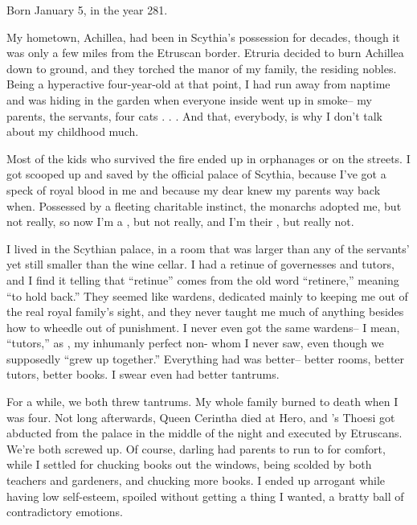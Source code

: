 \documentclass[char]{Kos}
\begin{document}
\name{\cWard{}}

Born January 5, in the year 281.

My hometown, Achillea, had been in Scythia's possession for decades, though it was only a few miles from the Etruscan border. Etruria decided to burn Achillea down to ground, and they torched the manor of my family, the residing nobles. Being a hyperactive four-year-old at that point, I had run away from naptime and was hiding in the garden when everyone inside went up in smoke-- my parents, the servants, four cats . . . And that, everybody, is why I don't talk about my childhood much.

Most of the kids who survived the fire ended up in orphanages or on the streets. I got scooped up and saved by the official palace of Scythia, because I've got a speck of royal blood in me and because my dear \cScythiaQueen{\Monarch} \cScythiaQueen{} knew my parents way back when. Possessed by a fleeting charitable instinct, the monarchs adopted me, but not really, so now I'm a \cWard{\prince}, but not really, and I'm their \cWard{\offspring}, but really not.

I lived in the Scythian palace, in a room that was larger than any of the servants' yet still smaller than the wine cellar. I had a retinue of governesses and tutors, and I find it telling that ``retinue'' comes from the old word ``retinere,'' meaning ``to hold back.'' They seemed like wardens, dedicated mainly to keeping me out of the real royal family's sight, and they never taught me much of anything besides how to wheedle out of punishment. I never even got the same wardens-- I mean, ``tutors,'' as \cBride{}, my inhumanly perfect non-\cBride{\sibling} \cBride{\sibling} whom I never saw, even though we supposedly ``grew up together.'' Everything \cBride{} had was better-- better rooms, better tutors, better books. I swear \cBride{\they} even had better tantrums.

For a while, we both threw tantrums. My whole family burned to death when I was four. Not long afterwards, Queen Cerintha died at Hero, and \cBride{}'s \cFugitive{\sibling} Thoesi got abducted from the palace in the middle of the night and executed by Etruscans. We're both screwed up. Of course, darling \cBride{} had \cBride{\their} parents to run to for comfort, while I settled for chucking books out the windows, being scolded by both teachers and gardeners, and chucking more books. I ended up arrogant while having low self-esteem, spoiled without getting a thing I wanted, a bratty ball of contradictory emotions. 
\end{document}
